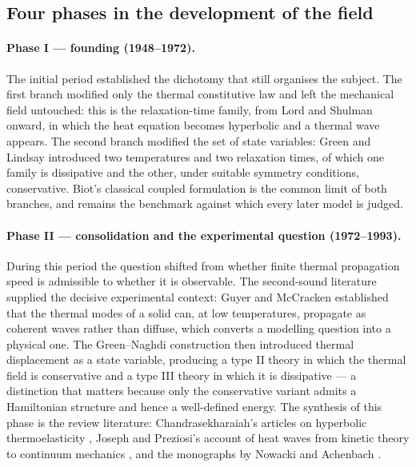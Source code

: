 \subsection{Four phases in the development of the field}

\paragraph{Phase I --- founding (1948--1972).} The initial period established the dichotomy that still organises the subject. The first branch modified only the thermal constitutive law and left the mechanical field untouched: this is the relaxation-time family, from Lord and Shulman \cite{Lord1967} onward, in which the heat equation becomes hyperbolic and a thermal wave appears. The second branch modified the set of state variables: Green and Lindsay \cite{Green1972} introduced two temperatures and two relaxation times, of which one family is dissipative and the other, under suitable symmetry conditions, conservative. Biot's classical coupled formulation \cite{Biot1956} is the common limit of both branches, and remains the benchmark against which every later model is judged.

\paragraph{Phase II --- consolidation and the experimental question (1972--1993).} During this period the question shifted from whether finite thermal propagation speed is admissible to whether it is observable. The second-sound literature supplied the decisive experimental context: Guyer and McCracken \cite{Guyer1990} established that the thermal modes of a solid can, at low temperatures, propagate as coherent waves rather than diffuse, which converts a modelling question into a physical one. The Green--Naghdi construction \cite{Green1991,Green1993} then introduced thermal displacement as a state variable, producing a type II theory in which the thermal field is conservative and a type III theory in which it is dissipative --- a distinction that matters because only the conservative variant admits a Hamiltonian structure and hence a well-defined energy. The synthesis of this phase is the review literature: Chandrasekharaiah's articles on hyperbolic thermoelasticity \cite{Chandrasekharaiah1986,Chandrasekharaiah1998}, Joseph and Preziosi's account of heat waves from kinetic theory to continuum mechanics \cite{Joseph1989,Joseph1990}, and the monographs by Nowacki \cite{Nowacki1975} and Achenbach \cite{Achenbach1973}.

